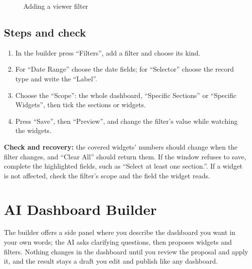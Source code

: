 \begin{figure}[H]
\centering
{}
\rclegend
\caption{Adding a viewer filter}
\label{fig:builder-dashboards-filters-flow}
\end{figure}

\subsection{Steps and check}
\begin{enumerate}
\item In the builder press “Filters”, add a filter and choose its kind.
\item For “Date Range” choose the date fields; for “Selector” choose the record type and write the “Label”.
\item Choose the “Scope”: the whole dashboard, “Specific Sections” or “Specific Widgets”, then tick the sections or widgets.
\item Press “Save”, then “Preview”, and change the filter's value while watching the widgets.
\end{enumerate}

\textbf{Check and recovery:} the covered widgets' numbers should change when the filter changes, and “Clear All” should return them. If the window refuses to save, complete the highlighted fields, such as “Select at least one section.”. If a widget is not affected, check the filter's scope and the field the widget reads.

\clearpage
\section{AI Dashboard Builder}
\label{sec:builder-feature-dashboards-ai-builder}

The builder offers a side panel where you describe the dashboard you want in your own words; the AI asks clarifying questions, then proposes widgets and filters. Nothing changes in the dashboard until you review the proposal and apply it, and the result stays a draft you edit and publish like any dashboard.

